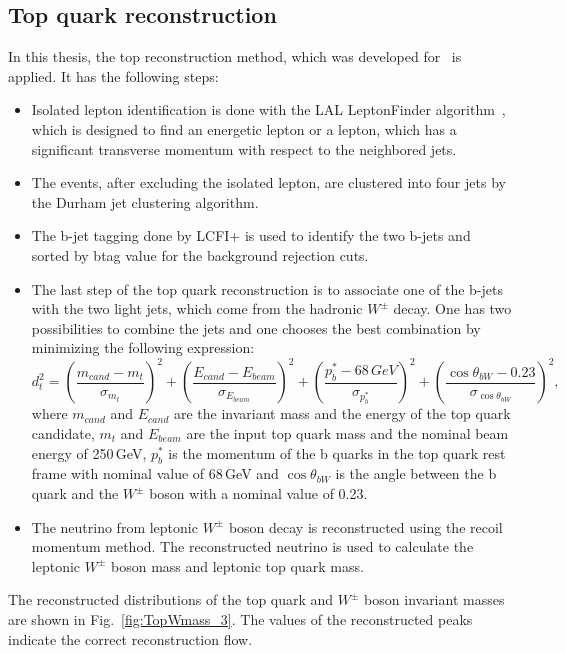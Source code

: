 \subsection{Top quark reconstruction}\label{sec:TopRec}
In this thesis, the top reconstruction method, which was developed for~\cite{bib:ILCTOP} is applied. It has the following steps:
\begin{itemize}
	\item Isolated lepton identification is done with the LAL LeptonFinder algorithm~\cite{bib:Doublet}, which is designed to find an energetic lepton or a lepton, which has a significant transverse momentum with respect to the neighbored jets. 
	\item The events, after excluding the isolated lepton, are clustered into four jets by the Durham jet clustering algorithm.
	\item The b-jet tagging done by LCFI+ is used to identify the two b-jets and sorted by btag value for the background rejection cuts. 
	\item The last step of the top quark reconstruction is to associate one of the b-jets with the two light jets, which come from the hadronic $W^\pm$ decay.  One has two possibilities to combine the jets and one chooses the best combination by minimizing the following expression:
	\begin{equation}
	\label{formula:Chi2Top_3}
	d^2_{t} = (\frac{m_{cand}-m_{t}}{\sigma_{m_t}})^2 + (\frac{E_{cand}-E_{beam}}{\sigma_{E_{beam}}})^2+(\frac{p^*_b-68\,GeV}{\sigma_{p^*_b}})^2 + (\frac{\cos\theta_{bW}-0.23}{\sigma_{\cos\theta_{bW}}})^2,
	\end{equation}
	where $m_{cand}$ and $E_{cand}$ are the invariant mass and the energy of the top quark candidate, $m_t$ and $E_{beam}$ are the input top quark mass and the nominal beam energy of 250\,GeV, $p^*_b$ is the momentum of the b quarks in the top quark rest frame with nominal value of 68\,GeV and $\cos\theta_{bW}$ is the angle between the b quark and the $W^\pm$ boson with a nominal value of 0.23.
	\item The neutrino from leptonic $W^\pm$ boson decay is reconstructed using the recoil momentum method. The reconstructed neutrino is used to calculate the leptonic $W^\pm$ boson mass and leptonic top quark mass. 
\end{itemize}

The reconstructed distributions of the top quark and $W^\pm$ boson invariant masses are shown in Fig.~\ref{fig:TopWmass_3}. The values of the reconstructed peaks indicate the correct reconstruction flow. 

